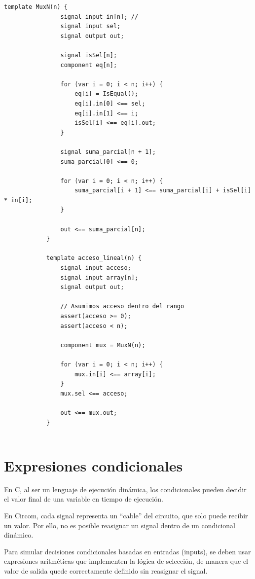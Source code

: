 \documentclass[a4paper,10pt]{article}
\begin{document}
		\vspace{0.4cm}
			
		\begin{lstlisting}[language=Circom]
			template MuxN(n) {
				signal input in[n]; //
				signal input sel;
				signal output out;
				
				signal isSel[n];
				component eq[n];
				
				for (var i = 0; i < n; i++) {
					eq[i] = IsEqual();
					eq[i].in[0] <== sel;
					eq[i].in[1] <== i;
					isSel[i] <== eq[i].out;
				}
				
				signal suma_parcial[n + 1];
				suma_parcial[0] <== 0;
				
				for (var i = 0; i < n; i++) {
					suma_parcial[i + 1] <== suma_parcial[i] + isSel[i] * in[i];
				}
				
				out <== suma_parcial[n];
			}
			
			template acceso_lineal(n) {
				signal input acceso;
				signal input array[n];
				signal output out;
				
				// Asumimos acceso dentro del rango
				assert(acceso >= 0);
				assert(acceso < n);
				
				component mux = MuxN(n);
				
				for (var i = 0; i < n; i++) {
					mux.in[i] <== array[i];
				}
				mux.sel <== acceso;
				
				out <== mux.out;
			}
			
		\end{lstlisting}
		
		\section{Expresiones condicionales}
		
		\noindent En C, al ser un lenguaje de ejecución dinámica, los condicionales pueden decidir el valor final de una variable en tiempo de ejecución.
		
		\vspace{0.3cm}
		
		\noindent En Circom, cada signal representa un “cable” del circuito, que solo puede recibir un valor. Por ello, no es posible reasignar un signal dentro de un condicional dinámico. 
		
		\vspace{0.3cm}
		
		\noindent Para simular decisiones condicionales basadas en entradas (inputs), se deben usar expresiones aritméticas que implementen la lógica de selección, de manera que el valor de salida quede correctamente definido sin reasignar el signal.
		
\end{document}
